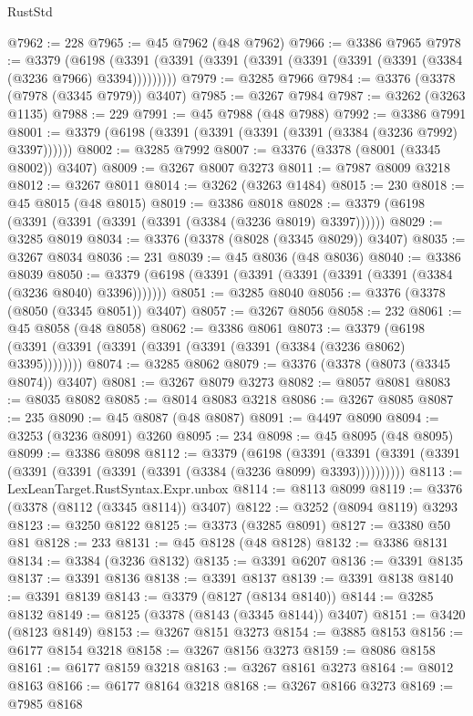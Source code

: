 \begin{lexlean}{RustStd}
\begin{coremodule}
@7962 := 228
@7965 := @45 @7962 (@48 @7962)
@7966 := @3386 @7965
@7978 := @3379
    (@6198 (@3391 (@3391 (@3391 (@3391 (@3391 (@3391 (@3391 (@3384 (@3236 @7966) @3394)))))))))
@7979 := @3285 @7966
@7984 := @3376 (@3378 (@7978 (@3345 @7979)) @3407)
@7985 := @3267 @7984
@7987 := @3262 (@3263 @1135)
@7988 := 229
@7991 := @45 @7988 (@48 @7988)
@7992 := @3386 @7991
@8001 := @3379 (@6198 (@3391 (@3391 (@3391 (@3391 (@3384 (@3236 @7992) @3397))))))
@8002 := @3285 @7992
@8007 := @3376 (@3378 (@8001 (@3345 @8002)) @3407)
@8009 := @3267 @8007 @3273
@8011 := @7987 @8009 @3218
@8012 := @3267 @8011
@8014 := @3262 (@3263 @1484)
@8015 := 230
@8018 := @45 @8015 (@48 @8015)
@8019 := @3386 @8018
@8028 := @3379 (@6198 (@3391 (@3391 (@3391 (@3391 (@3384 (@3236 @8019) @3397))))))
@8029 := @3285 @8019
@8034 := @3376 (@3378 (@8028 (@3345 @8029)) @3407)
@8035 := @3267 @8034
@8036 := 231
@8039 := @45 @8036 (@48 @8036)
@8040 := @3386 @8039
@8050 := @3379 (@6198 (@3391 (@3391 (@3391 (@3391 (@3391 (@3384 (@3236 @8040) @3396)))))))
@8051 := @3285 @8040
@8056 := @3376 (@3378 (@8050 (@3345 @8051)) @3407)
@8057 := @3267 @8056
@8058 := 232
@8061 := @45 @8058 (@48 @8058)
@8062 := @3386 @8061
@8073 := @3379 (@6198 (@3391 (@3391 (@3391 (@3391 (@3391 (@3391 (@3384 (@3236 @8062) @3395))))))))
@8074 := @3285 @8062
@8079 := @3376 (@3378 (@8073 (@3345 @8074)) @3407)
@8081 := @3267 @8079 @3273
@8082 := @8057 @8081
@8083 := @8035 @8082
@8085 := @8014 @8083 @3218
@8086 := @3267 @8085
@8087 := 235
@8090 := @45 @8087 (@48 @8087)
@8091 := @4497 @8090
@8094 := @3253 (@3236 @8091) @3260
@8095 := 234
@8098 := @45 @8095 (@48 @8095)
@8099 := @3386 @8098
@8112 := @3379
    (@6198
      (@3391 (@3391 (@3391 (@3391 (@3391 (@3391 (@3391 (@3391 (@3384 (@3236 @8099) @3393))))))))))
@8113 := LexLeanTarget.RustSyntax.Expr.unbox
@8114 := @8113 @8099
@8119 := @3376 (@3378 (@8112 (@3345 @8114)) @3407)
@8122 := @3252 (@8094 @8119) @3293
@8123 := @3250 @8122
@8125 := @3373 (@3285 @8091)
@8127 := @3380 @50 @81
@8128 := 233
@8131 := @45 @8128 (@48 @8128)
@8132 := @3386 @8131
@8134 := @3384 (@3236 @8132)
@8135 := @3391 @6207
@8136 := @3391 @8135
@8137 := @3391 @8136
@8138 := @3391 @8137
@8139 := @3391 @8138
@8140 := @3391 @8139
@8143 := @3379 (@8127 (@8134 @8140))
@8144 := @3285 @8132
@8149 := @8125 (@3378 (@8143 (@3345 @8144)) @3407)
@8151 := @3420 (@8123 @8149)
@8153 := @3267 @8151 @3273
@8154 := @3885 @8153
@8156 := @6177 @8154 @3218
@8158 := @3267 @8156 @3273
@8159 := @8086 @8158
@8161 := @6177 @8159 @3218
@8163 := @3267 @8161 @3273
@8164 := @8012 @8163
@8166 := @6177 @8164 @3218
@8168 := @3267 @8166 @3273
@8169 := @7985 @8168

\end{coremodule}
\end{lexlean}

